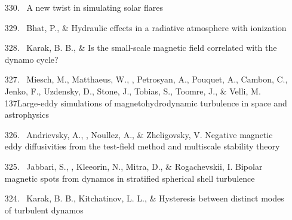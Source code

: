 \begin{itemize}
\item[{330.}~]
\Brandenburg{}
{A new twist in simulating solar flares}

\item[{329.}~]
Bhat, P., \& \Brandenburg{}
{Hydraulic effects in a radiative atmosphere with ionization}

\item[{328.}~]
Karak, B. B., \& \Brandenburg{}
{Is the small-scale magnetic field correlated with the dynamo cycle?}

\item[{327.}~]
Miesch, M., Matthaeus, W., \Brandenburg, Petrosyan, A., Pouquet, A., Cambon, C., Jenko, F., Uzdensky, D., Stone, J., Tobias, S., Toomre, J., \& Velli, M.
{137}{Large-eddy simulations of magnetohydrodynamic turbulence in space and astrophysics}

\item[{326.}~]
Andrievsky, A., \Brandenburg, Noullez, A., \& Zheligovsky, V.
{Negative magnetic eddy diffusivities from the test-field method and multiscale stability theory}

\item[{325.}~]
Jabbari, S., \Brandenburg, Kleeorin, N., Mitra, D., \& Rogachevskii, I.
{Bipolar magnetic spots from dynamos in stratified spherical shell turbulence}

\item[{324.}~]
Karak, B. B., Kitchatinov, L. L., \& \Brandenburg{}
{Hysteresis between distinct modes of turbulent dynamos}


\end{itemize}
